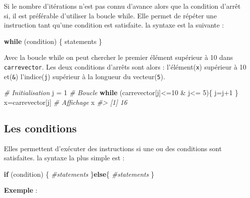 \documentclass[
]{book}
\newenvironment{Shaded}{\begin{snugshade}}{\end{snugshade}}
\newcommand{\CommentTok}[1]{\textcolor[rgb]{0.56,0.35,0.01}{\textit{#1}}}
\newcommand{\ControlFlowTok}[1]{\textcolor[rgb]{0.13,0.29,0.53}{\textbf{#1}}}
\newcommand{\DecValTok}[1]{\textcolor[rgb]{0.00,0.00,0.81}{#1}}
\newcommand{\NormalTok}[1]{#1}
\newcommand{\OtherTok}[1]{\textcolor[rgb]{0.56,0.35,0.01}{#1}}
\newcommand{\SpecialCharTok}[1]{\textcolor[rgb]{0.00,0.00,0.00}{#1}}
\begin{document}
Si le nombre d'itérations n'est pas connu d'avance alors que la condition d'arrêt si, il est préférable d'utiliser la boucle while. Elle permet de répéter une instruction tant qu'une condition est satisfaite. la syntaxe est la suivante :

\begin{Shaded}
\begin{Highlighting}[]
\ControlFlowTok{while}\NormalTok{ (condition) \{}
\NormalTok{  statements}
\NormalTok{\}}
\end{Highlighting}
\end{Shaded}

Avec la boucle while on peut chercher le premier élément supérieur à 10 dans \texttt{carrevector}. Les deux conditions d'arrêts sont alors : l'élément(\texttt{x}) supérieur à 10 et(\texttt{\&}) l'indice(\texttt{j}) supérieur à la longueur du vecteur(\texttt{5}).

\begin{Shaded}
\begin{Highlighting}[]
\CommentTok{\# Initialisation}
\NormalTok{j }\OtherTok{=} \DecValTok{1}
\CommentTok{\# Boucle}
\ControlFlowTok{while}\NormalTok{ (carrevector[j]}\SpecialCharTok{\textless{}=}\DecValTok{10} \SpecialCharTok{\&}\NormalTok{ j}\SpecialCharTok{\textless{}=} \DecValTok{5}\NormalTok{)\{}
\NormalTok{  j}\OtherTok{=}\NormalTok{j}\SpecialCharTok{+}\DecValTok{1}
\NormalTok{\}}
\NormalTok{x}\OtherTok{=}\NormalTok{carrevector[j]}
\CommentTok{\# Affichage}
\NormalTok{x}
\CommentTok{\#\textgreater{} [1] 16}
\end{Highlighting}
\end{Shaded}

\hypertarget{les-conditions}{%
\subsection{Les conditions}\label{les-conditions}}

Elles permettent d'exécuter des instructions si une ou des conditions sont satisfaites. la syntaxe la plus simple est :

\begin{Shaded}
\begin{Highlighting}[]
\ControlFlowTok{if}\NormalTok{ (condition) \{}
  \CommentTok{\#statements}
\NormalTok{\}}\ControlFlowTok{else}\NormalTok{\{}
  \CommentTok{\#statements}
\NormalTok{\}}
\end{Highlighting}
\end{Shaded}

\textbf{Exemple} :
\end{document}
